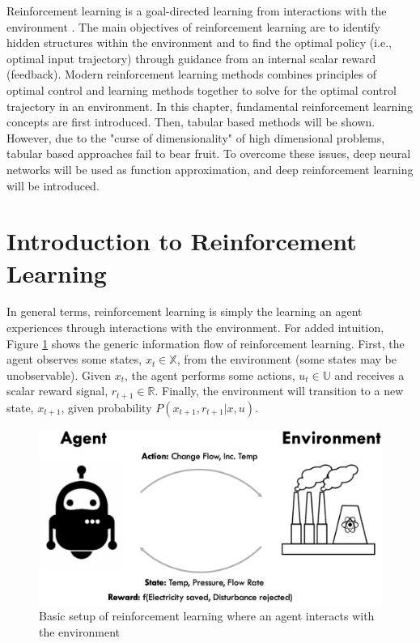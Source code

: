 Reinforcement learning is a goal-directed learning from interactions with the environment \cite{sutton}. The main objectives of reinforcement learning are to identify hidden structures within the environment and to find the optimal policy (i.e., optimal input trajectory) through guidance from an internal scalar reward (feedback).  Modern reinforcement learning methods combines principles of optimal control and learning methods together to solve for the optimal control trajectory in an environment.  In this chapter, fundamental reinforcement learning concepts are first introduced.  Then, tabular based methods will be shown.  However, due to the "curse of dimensionality" of high dimensional problems, tabular based approaches fail to bear fruit.  To overcome these issues, deep neural networks will be used as function approximation, and deep reinforcement learning will be introduced.


\section{Introduction to Reinforcement Learning}

In general terms, reinforcement learning is simply the learning an agent experiences through interactions with the environment.  For added intuition, Figure \ref{fig: simple_rl} shows the generic information flow of reinforcement learning. First, the agent observes some states, $x_t \in \mathbb{X}$, from the environment (some states may be unobservable).  Given $x_t$, the agent performs some actions, $u_t \in \mathbb{U}$ and receives a scalar reward signal, $r_{t+1} \in \mathbb{R}$.  Finally, the environment will transition to a new state, $x_{t+1}$, given probability $P(x_{t+1}, r_{t+1} | x, u)$.

\begin{figure}[h]
    \centering
    \includegraphics[scale=0.5]{images/RL.png}
    \caption{Basic setup of reinforcement learning where an agent interacts with the environment}
    \label{fig: simple_rl}

\end{figure}

